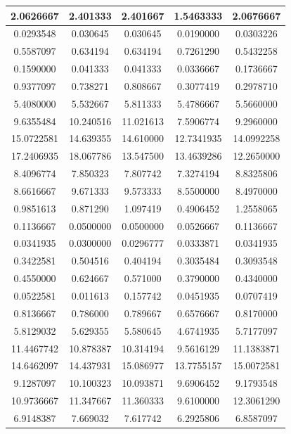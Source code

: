 \begin{longtable}{|c|c|c|c|c|}
    2.0626667 & 2.401333 & 2.401667 & 1.5463333 & 2.0676667 \\ \hline
    0.0293548 & 0.030645 & 0.030645 & 0.0190000 & 0.0303226 \\ \hline
    0.5587097 & 0.634194 & 0.634194 & 0.7261290 & 0.5432258 \\ \hline
    0.1590000 & 0.041333 & 0.041333 & 0.0336667 & 0.1736667 \\ \hline
    0.9377097 & 0.738271 & 0.808667 & 0.3077419 & 0.2978710 \\ \hline
    5.4080000 & 5.532667 & 5.811333 & 5.4786667 & 5.5660000 \\ \hline
    9.6355484 & 10.240516 & 11.021613 & 7.5906774 & 9.2960000 \\ \hline
    15.0722581 & 14.639355 & 14.610000 & 12.7341935 & 14.0992258 \\ \hline
    17.2406935 & 18.067786 & 13.547500 & 13.4639286 & 12.2650000 \\ \hline
    8.4096774 & 7.850323 & 7.807742 & 7.3274194 & 8.8325806 \\ \hline
    8.6616667 & 9.671333 & 9.573333 & 8.5500000 & 8.4970000 \\ \hline
    0.9851613 & 0.871290 & 1.097419 & 0.4906452 & 1.2558065 \\ \hline
    0.1136667 & 0.0500000 & 0.0500000 & 0.0526667 & 0.1136667 \\ \hline
    0.0341935 & 0.0300000 & 0.0296777 & 0.0333871 & 0.0341935 \\ \hline
    0.3422581 & 0.504516 & 0.404194 & 0.3035484 & 0.3093548 \\ \hline
    0.4550000 & 0.624667 & 0.571000 & 0.3790000 & 0.4340000 \\ \hline
    0.0522581 & 0.011613 & 0.157742 & 0.0451935 & 0.0707419 \\ \hline
    0.8136667 & 0.786000 & 0.789667 & 0.6576667 & 0.8170000 \\ \hline
    5.8129032 & 5.629355 & 5.580645 & 4.6741935 & 5.7177097 \\ \hline
    11.4467742 & 10.878387 & 10.314194 & 9.5616129 & 11.1383871 \\ \hline
    14.6462097 & 14.437931 & 15.086977 & 13.7755157 & 15.0072581 \\ \hline
    9.1287097 & 10.100323 & 10.093871 & 9.6906452 & 9.1793548 \\ \hline
    10.9736667 & 11.347667 & 11.360333 & 9.6100000 & 12.3061290 \\ \hline
    6.9148387 & 7.669032 & 7.617742 & 6.2925806 & 6.8587097 \\ \hline

\end{longtable}
